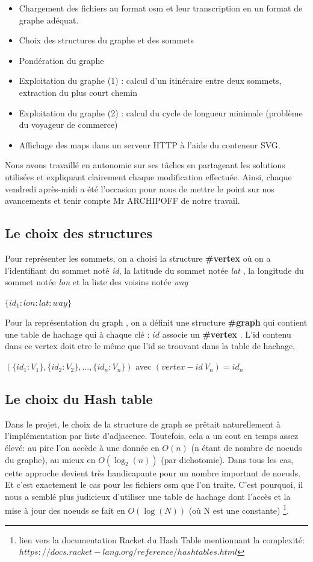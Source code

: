 \documentclass[french]{article}
\begin{document}
\begin{itemize}
\item Chargement des fichiers au format osm et leur transcription en un format de graphe adéquat.
\item Choix des structures du graphe et des sommets
\item Pondération du graphe
\item Exploitation du graphe (1) : calcul d’un itinéraire entre deux sommets, extraction du plus court chemin 
\item Exploitation du graphe (2) : calcul du cycle de longueur minimale (problème du voyageur de commerce) 
\item Affichage des maps dans un serveur HTTP à l'aide du conteneur SVG.
\end{itemize}


Nous avons travaillé en autonomie sur ses tâches en partageant les solutions utilisées et expliquant clairement chaque modification effectuée. Ainsi, chaque vendredi après-midi a été l’occasion pour nous de mettre le point sur nos avancements et tenir compte Mr ARCHIPOFF de notre travail.  

\subsection{Le choix des structures} 

Pour représenter les sommets, on a choisi la structure \textbf{\#vertex} où on a l'identifiant du sommet noté  \textit{id}, la latitude du sommet notée \textit{lat} , la longitude du sommet notée \textit{lon} et la liste des voisins notée \textit{way}
\begin{center}
                               $\{id_1:lon:lat:way\}$
\end{center}
Pour la représentation du graph , on a définit une structure \textbf{\#graph} qui contient une table de hachage qui à chaque clé : $id$ associe un \textbf{\#vertex} . L'id contenu dans ce vertex doit etre le même que l'id se trouvant dans la table de hachage, 
\begin{center} 
                   $(\{id_1:V_1\},\{id_2:V_2\},..., \{id_n:V_n\})$ avec $(vertex-id~V_n)=id_n$
\end{center}

\subsection{Le choix du Hash table}%
Dans le projet, le choix de la structure de graph se prêtait naturellement à l'implémentation par liste d'adjacence. Toutefois, cela a un cout en temps assez élevé: au pire l'on accède à une donnée en $O(n)$ (n étant de nombre de noeuds du graphe), au mieux en $O(\log_2(n))$ (par dichotomie). Dans tous les cas, cette approche devient très handicapante pour un nombre important de noeuds. Et c'est exactement le cas pour les fichiers osm que l'on traite. C'est pourquoi, il nous a semblé plus judicieux d'utiliser une table de hachage dont l'accès et la mise à jour des noeuds se fait en $O(\log(N))$ (où N est une constante)
\footnote{lien vers la documentation Racket du Hash Table mentionnant la complexité: $https://docs.racket-lang.org/reference/hashtables.html$}.
\end{document}
